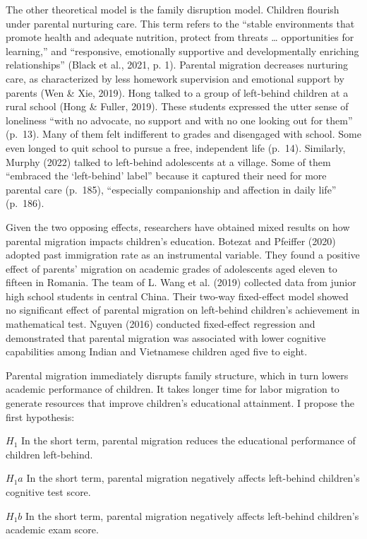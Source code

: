 \documentclass[
  man,floatsintext]{apa7}
\begin{document}
The other theoretical model is the family disruption model. Children flourish under parental nurturing care. This term refers to the ``stable environments that promote health and adequate nutrition, protect from threats \ldots{} opportunities for learning,'' and ``responsive, emotionally supportive and developmentally enriching relationships'' (Black et al., 2021, p. 1). Parental migration decreases nurturing care, as characterized by less homework supervision and emotional support by parents (Wen \& Xie, 2019). Hong talked to a group of left-behind children at a rural school (Hong \& Fuller, 2019). These students expressed the utter sense of loneliness ``with no advocate, no support and with no one looking out for them'' (p.~13). Many of them felt indifferent to grades and disengaged with school. Some even longed to quit school to pursue a free, independent life (p.~14). Similarly, Murphy (2022) talked to left-behind adolescents at a village. Some of them ``embraced the `left-behind' label'' because it captured their need for more parental care (p.~185), ``especially companionship and affection in daily life'' (p.~186).

Given the two opposing effects, researchers have obtained mixed results on how parental migration impacts children's education. Botezat and Pfeiffer (2020) adopted past immigration rate as an instrumental variable. They found a positive effect of parents' migration on academic grades of adolescents aged eleven to fifteen in Romania. The team of L. Wang et al. (2019) collected data from junior high school students in central China. Their two-way fixed-effect model showed no significant effect of parental migration on left-behind children's achievement in mathematical test. Nguyen (2016) conducted fixed-effect regression and demonstrated that parental migration was associated with lower cognitive capabilities among Indian and Vietnamese children aged five to eight.

Parental migration immediately disrupts family structure, which in turn lowers academic performance of children. It takes longer time for labor migration to generate resources that improve children's educational attainment. I propose the first hypothesis:

\(H_1\) In the short term, parental migration reduces the educational performance of children left-behind.

\(H_1a\) In the short term, parental migration negatively affects left-behind children's cognitive test score.

\(H_1b\) In the short term, parental migration negatively affects left-behind children's academic exam score.
\end{document}

